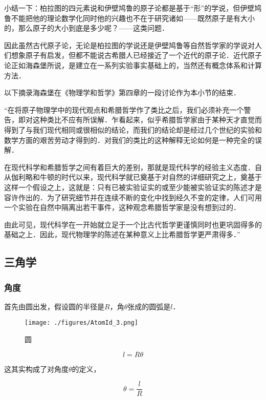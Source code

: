 小结一下：柏拉图的四元素说和伊壁鸠鲁的原子论都是基于“形”的学说，但伊壁鸠鲁不能把他的理论数学化同时他的兴趣也不在于研究诸如——既然原子是有大小的，那么原子的大小到底是多少呢？——这类问题．

因此虽然古代原子论，无论是柏拉图的学说还是伊壁鸠鲁等自然哲学家的学说对人们想象原子有启发，但都不能说古希腊人已经接近了一个近代的原子论．近代原子论正如海森堡所说，是建立在一系列实验事实基础上的，当然还有概念体系和计算方法．

以下摘录海森堡在《物理学和哲学》第四章的一段讨论作为本小节的结束．

“在将原子物理学中的现代观点和希腊哲学作了类比之后，我们必须补充一个警告，即对这种类比不应有所误解．乍看起来，似乎希腊哲学家由于某种天才直觉而得到了与我们现代相同或很相似的结论，而我们的结论却是经过几个世纪的实验和数学方面的艰苦劳动才得到的．对我们的类比的这种解释无论如何是一种完全的误解．

在现代科学和希腊哲学之间有着巨大的差别，那就是现代科学的经验主义态度．自从伽利略和牛顿的时代以来，现代科学就已奠基于对自然的详细研究之上，奠基于这样一个假设之上，这就是：只有已被实验证实的或至少能被实验证实的陈述才是容许作出的．为了研究细节并在连续不断的变化中找到经久不变的定律，人们可用一个实验在自然中隔离出若干事件，这种观念希腊哲学家是没有想到过的．

由此可见，现代科学在一开始就立足于一个比古代哲学更谨慎同时也更巩固得多的基础之上．因此，现代物理学的陈述在某种意义上比希腊哲学更严肃得多．”

\subsection{三角学}

\subsubsection{角度}

首先由圆出发，假设圆的半径是$R$，角$\theta$张成的圆弧是$l$．

\begin{figure}[ht]
\centering
\texttt{[image: ./figures/AtomId\_3.png]}
\caption{圆} \label{AtomId_fig3}
\end{figure}

\begin{equation}
l = R \theta
\end{equation}

这其实构成了对角度$\theta$的定义，

\begin{equation}
\theta = \frac{l }{R }
\end{equation}

